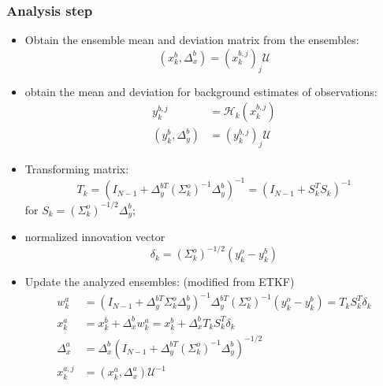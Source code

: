 \documentclass{article}
\begin{document}
\subsubsection{Analysis step}
\begin{itemize}
	\item Obtain the ensemble mean and deviation matrix from the ensembles:
	      $$
		      (x_k^b,\Delta_x^b)=(x_k^{b,j})_j\mathscr{U}
	      $$
	\item obtain the mean and deviation for background estimates of observations:
	      \begin{align*}
		      y_k^{b,j}          & =\mathcal{H}_k(x_k^{b,j}) \\
		      (y_k^b,\Delta_y^b) & =(y_k^{b,j})_j\mathscr{U}
	      \end{align*}
	\item Transforming matrix:
	      $$
		      T_k=(I_{N-1}+\Delta_y^{bT}(\Sigma_k^o)^{-1}\Delta_y^b)^{-1}=(I_{N-1} + S_k^TS_k)^{-1}
	      $$
	      for $S_k=(\Sigma_k^o)^{-1/2}\Delta_y^b$;

	\item normalized innovation vector
	      $$
		      \delta_k = (\Sigma_k^o)^{-1/2}(y_k^o-y_k^b)
	      $$
	\item Update the analyzed ensembles: (modified from ETKF)
	      \begin{align*}
		      w_k^a      & = (I_{N-1} + \Delta_y^{bT}\Sigma_k^o \Delta_y^b)^{-1}\Delta_y^{bT}(\Sigma_k^o)^{-1}(y_k^o-y_k^b)=T_kS_k^T\delta_k \\
		      x_k^a      & = x_k^b + \Delta_x^bw_k^a = x_k^b + \Delta_x^bT_kS_k^T\delta_k                                                    \\
		      \Delta_x^a & = \Delta_x^b(I_{N-1}+\Delta_y^{bT}(\Sigma_k^o)^{-1}\Delta_y^b)^{-1/2}                                             \\
		      x_k^{a,j}  & = (x_k^a,\Delta_x^a)\mathscr{U}^{-1}
	      \end{align*}
\end{itemize}
\end{document}
